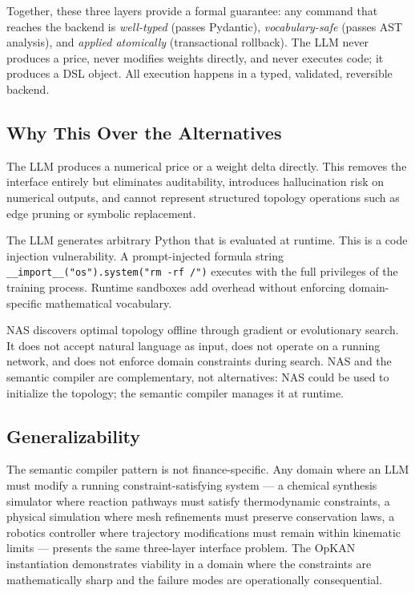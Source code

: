 \documentclass[11pt,a4paper]{article}
\begin{document}
Together, these three layers provide a formal guarantee: any command that reaches the
backend is \emph{well-typed} (passes Pydantic), \emph{vocabulary-safe} (passes AST
analysis), and \emph{applied atomically} (transactional rollback). The LLM never
produces a price, never modifies weights directly, and never executes code; it produces
a DSL object. All execution happens in a typed, validated, reversible backend.

\subsection{Why This Over the Alternatives}

\begin{description}[nosep]
  \item[Direct LLM output (price or weight update).]
  The LLM produces a numerical price or a weight delta directly. This removes the
  interface entirely but eliminates auditability, introduces hallucination risk on
  numerical outputs, and cannot represent structured topology operations such as
  edge pruning or symbolic replacement.

  \item[Prompt-to-eval() (LLM generates Python, eval runs it).]
  The LLM generates arbitrary Python that is evaluated at runtime. This is a code
  injection vulnerability. A prompt-injected formula string
  \texttt{\_\_import\_\_("os").system("rm -rf /")} executes with the full privileges
  of the training process. Runtime sandboxes add overhead without enforcing
  domain-specific mathematical vocabulary.

  \item[Neural architecture search.]
  NAS discovers optimal topology offline through gradient or evolutionary search.
  It does not accept natural language as input, does not operate on a running
  network, and does not enforce domain constraints during search. NAS and the
  semantic compiler are complementary, not alternatives: NAS could be used to
  initialize the topology; the semantic compiler manages it at runtime.
\end{description}

\subsection{Generalizability}

The semantic compiler pattern is not finance-specific. Any domain where an LLM must
modify a running constraint-satisfying system --- a chemical synthesis simulator
where reaction pathways must satisfy thermodynamic constraints, a physical simulation
where mesh refinements must preserve conservation laws, a robotics controller where
trajectory modifications must remain within kinematic limits --- presents the same
three-layer interface problem. The OpKAN instantiation demonstrates viability in a
domain where the constraints are mathematically sharp and the failure modes are
operationally consequential.
\end{document}
